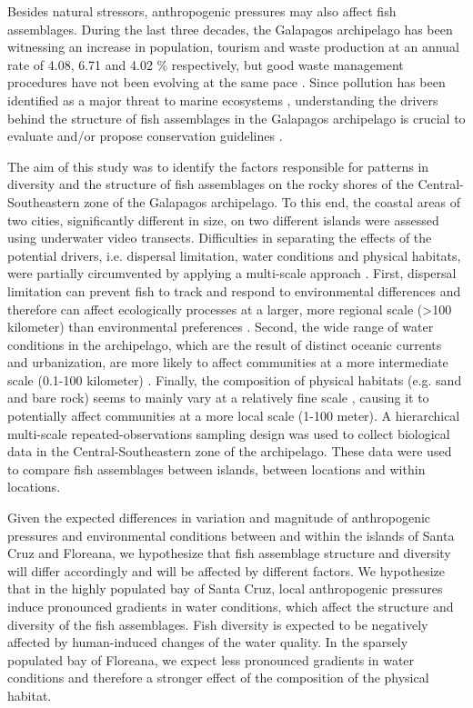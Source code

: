 Besides natural stressors, anthropogenic pressures may also affect fish assemblages. During the last three decades, the Galapagos archipelago has been witnessing an increase in population, tourism and waste production at an annual rate of 4.08, 6.71 and 4.02 \% respectively, but good waste management procedures have not been evolving at the same pace \citep{Alava2014PollutionPerspectives,Fernandez2008CoastalIsland,Hardter2010WasteIslands,MinistryofTourismofEcuador2019Observatorio2019-09-12,Riascos-Flores2020PollutedEcuador}. Since pollution has been identified as a major threat to marine ecosystems \citep{Boersma1999LimitingSolution}, understanding the drivers behind the structure of fish assemblages in the Galapagos archipelago is crucial to evaluate and/or propose conservation guidelines \citep{Mateus2019AnArchipelago}.  

The aim of this study was to identify the factors responsible for patterns in diversity and the structure of fish assemblages on the rocky shores of the Central-Southeastern zone of the Galapagos archipelago. To this end, the coastal areas of two cities, significantly different in size, on two different islands were assessed using underwater video transects. 
Difficulties in separating the effects of the potential drivers, i.e. dispersal limitation, water conditions and physical habitats, were partially circumvented by applying a multi-scale approach \citep{Thuiller2015}. First, dispersal limitation can prevent fish to track and respond to environmental differences and therefore can affect ecologically processes at a larger, more regional scale (>100 kilometer) than environmental preferences \citep{Bruneel2018,Leibold2004,Leibold2017}. Second, the wide range of water conditions in the archipelago, which are the result of distinct oceanic currents and urbanization, are more likely to affect communities at a more intermediate scale (0.1-100 kilometer) \citep{Houvenaghel1978OceanographicIslands,Liu2014,Mateus2019AnArchipelago}. Finally, the composition of physical habitats (e.g. sand and bare rock) seems to mainly vary at a relatively fine scale \citep{Okey2004AStrategies}, causing it to potentially affect communities at a more local scale (1-100 meter).  
A hierarchical multi-scale repeated-observations sampling design was used to collect biological data in the Central-Southeastern zone of the archipelago. These data were used to compare fish assemblages between islands, between locations and within locations. 

Given the expected differences in variation and magnitude of anthropogenic pressures and environmental conditions between and within the islands of Santa Cruz and Floreana, we hypothesize that fish assemblage structure and diversity will differ accordingly and will be affected by different factors. We hypothesize that in the highly populated bay of Santa Cruz, local anthropogenic pressures induce pronounced gradients in water conditions, which affect the structure and diversity of the fish assemblages. Fish diversity is expected to be negatively affected by human-induced changes of the water quality. In the sparsely populated bay of Floreana, we expect less pronounced gradients in water conditions and therefore a stronger effect of the composition of the physical habitat.    


